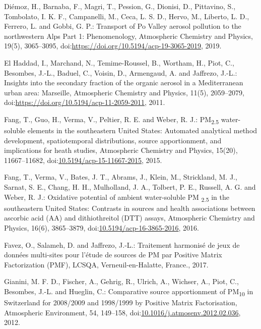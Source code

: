 \documentclass[
]{article}
\begin{document}
Diémoz, H., Barnaba, F., Magri, T., Pession, G., Dionisi, D., Pittavino,
S., Tombolato, I. K. F., Campanelli, M., Ceca, L. S. D., Hervo, M.,
Liberto, L. D., Ferrero, L. and Gobbi, G. P.: Transport of Po Valley
aerosol pollution to the northwestern Alps Part 1: Phenomenology,
Atmospheric Chemistry and Physics, 19(5), 3065--3095,
doi:\href{https://doi.org/https://doi.org/10.5194/acp-19-3065-2019}{https://doi.org/10.5194/acp-19-3065-2019},
2019.

El Haddad, I., Marchand, N., Temime-Roussel, B., Wortham, H., Piot, C.,
Besombes, J.-L., Baduel, C., Voisin, D., Armengaud, A. and Jaffrezo,
J.-L.: Insights into the secondary fraction of the organic aerosol in a
Mediterranean urban area: Marseille, Atmospheric Chemistry and Physics,
11(5), 2059--2079,
doi:\href{https://doi.org/https://doi.org/10.5194/acp-11-2059-2011}{https://doi.org/10.5194/acp-11-2059-2011},
2011.

Fang, T., Guo, H., Verma, V., Peltier, R. E. and Weber, R. J.:
PM\textsubscript{2.5} water-soluble elements in the southeastern United
States: Automated analytical method development, spatiotemporal
distributions, source apportionment, and implications for heath studies,
Atmospheric Chemistry and Physics, 15(20), 11667--11682,
doi:\href{https://doi.org/10.5194/acp-15-11667-2015}{10.5194/acp-15-11667-2015},
2015.

Fang, T., Verma, V., Bates, J. T., Abrams, J., Klein, M., Strickland, M.
J., Sarnat, S. E., Chang, H. H., Mulholland, J. A., Tolbert, P. E.,
Russell, A. G. and Weber, R. J.: Oxidative potential of ambient
water-soluble PM \textsubscript{2.5} in the southeastern United States:
Contrasts in sources and health associations between ascorbic acid (AA)
and dithiothreitol (DTT) assays, Atmospheric Chemistry and Physics,
16(6), 3865--3879,
doi:\href{https://doi.org/10.5194/acp-16-3865-2016}{10.5194/acp-16-3865-2016},
2016.

Favez, O., Salameh, D. and Jaffrezo, J.-L.: Traitement harmonisé de jeux
de données multi-sites pour l'étude de sources de PM par Positive Matrix
Factorization (PMF), LCSQA, Verneuil-en-Halatte, France., 2017.

Gianini, M. F. D., Fischer, A., Gehrig, R., Ulrich, A., Wichser, A.,
Piot, C., Besombes, J.-L. and Hueglin, C.: Comparative source
apportionment of PM\textsubscript{10} in Switzerland for 2008/2009 and
1998/1999 by Positive Matrix Factorisation, Atmospheric Environment, 54,
149--158,
doi:\href{https://doi.org/10.1016/j.atmosenv.2012.02.036}{10.1016/j.atmosenv.2012.02.036},
2012.
\end{document}
